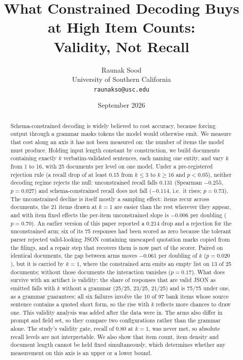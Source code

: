 \documentclass[11pt]{article}
\title{\bfseries What Constrained Decoding Buys at High Item Counts:\\[2pt]
Validity, Not Recall}
\author{Raunak Sood\\
\normalsize University of Southern California\\
\normalsize \texttt{raunakso@usc.edu}}
\date{September 2026}
\begin{document}
\maketitle

\begin{abstract}
\noindent
Schema-constrained decoding is widely believed to cost accuracy, because forcing
output through a grammar masks tokens the model would otherwise emit. We measure
that cost along an axis it has not been measured on: the number of items the
model must produce. Holding input length constant by construction, we build
documents containing exactly $k$ verbatim-validated sentences, each naming one
entity, and vary $k$ from 1 to 16, with 25 documents per level on one model.
Under a pre-registered rejection rule (a recall drop of at least 0.15 from
$k \le 3$ to $k \ge 16$ and $p < 0.05$), neither decoding regime rejects the
null: unconstrained recall falls 0.131 (Spearman $-0.255$, $p = 0.027$) and
schema-constrained recall does not fall ($-0.114$, i.e.\ it rises; $p = 0.73$).
The unconstrained decline is itself mostly a sampling effect: items recur across
documents, the 21 items drawn at $k = 1$ are easier than the rest wherever they
appear, and with item fixed effects the per-item unconstrained slope is $-0.006$
per doubling ($p = 0.70$).
An earlier version of this paper reported a 0.214 drop and a rejection for the
unconstrained arm; six of its 75 responses had been scored as zero because the
tolerant parser rejected valid-looking JSON containing unescaped quotation marks
copied from the filings, and a repair step that recovers them is now part of the
scorer. Paired on identical documents, the gap between arms moves $-0.061$ per
doubling of $k$ ($p = 0.020$), but it is carried by $k = 1$, where the
constrained arm emits an empty list on 13 of 25 documents; without those
documents the interaction vanishes ($p = 0.17$). What does survive with an
artifact is validity: the share of responses that are valid JSON as emitted
falls with $k$ without a grammar (25/25, 23/25, 21/25) and is 75/75 under one,
as a grammar guarantees; all six failures involve the 10 of 97 bank items whose
source sentence contains a quoted short form, so the rise with $k$ reflects more
chances to draw one. This validity analysis was added after the data were in.
The arms also differ in prompt and field set, so they compare two configurations
rather than the grammar alone.
The study's validity gate, recall of 0.80 at $k = 1$, was never met, so absolute
recall levels are not interpretable. We also show that item count, item density
and document length cannot be held fixed simultaneously, which determines
whether any measurement on this axis is an upper or a lower bound.
\end{abstract}
\end{document}
